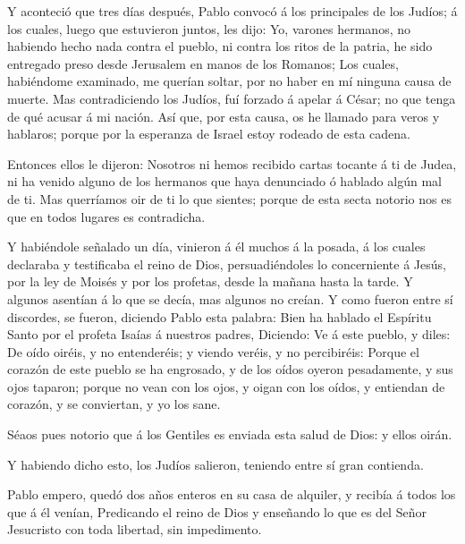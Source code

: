  Y aconteció que tres días después, Pablo convocó á los
principales de los Judíos; á los cuales, luego que estuvieron juntos,
les dijo: Yo, varones hermanos, no habiendo hecho nada contra el pueblo,
ni contra los ritos de la patria, he sido entregado preso desde
Jerusalem en manos de los Romanos;  Los cuales, habiéndome
examinado, me querían soltar, por no haber en mí ninguna causa de
muerte.  Mas contradiciendo los Judíos, fuí forzado á
apelar á César; no que tenga de qué acusar á mi nación. 
Así que, por esta causa, os he llamado para veros y hablaros; porque por
la esperanza de Israel estoy rodeado de esta cadena.

 Entonces ellos le dijeron: Nosotros ni hemos recibido
cartas tocante á ti de Judea, ni ha venido alguno de los hermanos que
haya denunciado ó hablado algún mal de ti.  Mas querríamos
oir de ti lo que sientes; porque de esta secta notorio nos es que en
todos lugares es contradicha.

 Y habiéndole señalado un día, vinieron á él muchos á la
posada, á los cuales declaraba y testificaba el reino de Dios,
persuadiéndoles lo concerniente á Jesús, por la ley de Moisés y por los
profetas, desde la mañana hasta la tarde.  Y algunos
asentían á lo que se decía, mas algunos no creían.  Y como
fueron entre sí discordes, se fueron, diciendo Pablo esta palabra: Bien
ha hablado el Espíritu Santo por el profeta Isaías á nuestros padres,
 Diciendo: Ve á este pueblo, y diles: De oído oiréis, y no
entenderéis; y viendo veréis, y no percibiréis:  Porque el
corazón de este pueblo se ha engrosado, y de los oídos oyeron
pesadamente, y sus ojos taparon; porque no vean con los ojos, y oigan
con los oídos, y entiendan de corazón, y se conviertan, y yo los sane.

 Séaos pues notorio que á los Gentiles es enviada esta
salud de Dios: y ellos oirán.

 Y habiendo dicho esto, los Judíos salieron, teniendo entre
sí gran contienda.

 Pablo empero, quedó dos años enteros en su casa de
alquiler, y recibía á todos los que á él venían, 
Predicando el reino de Dios y enseñando lo que es del Señor Jesucristo
con toda libertad, sin impedimento.
